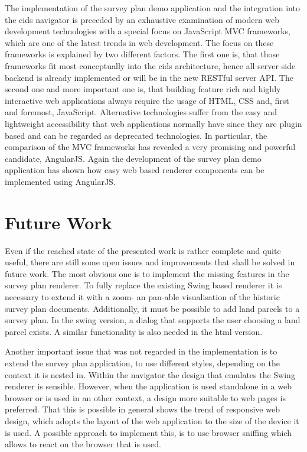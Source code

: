 The implementation of the survey plan demo application and the integration into the cids navigator is preceded by an exhaustive examination of modern web development technologies with a special focus on JavaScript MVC frameworks, which are one of the latest trends in web development. 
The focus on these frameworks is explained by two different factors. 
The first one is, that those frameworks fit most conceptually into the cids architecture, hence all server side backend is already implemented or will be in the new RESTful server API. 
The second one and more important one is, that building feature rich and highly interactive web applications always require the usage of HTML, CSS and, first and foremost, JavaScript. 
Alternative technologies suffer from the easy and lightweight accessibility that web applications normally have since they are plugin based and can be regarded as deprecated technologies. 
In particular, the comparison of the MVC frameworks has revealed a very promising and powerful candidate, AngularJS. 
Again the development of the survey plan demo application has shown how easy web based renderer components can be implemented using AngularJS.  

\newpage

\section{Future Work}

Even if the reached state of the presented work is rather complete and quite useful, there are still some open issues and improvements that shall be solved in future work. 
The most obvious one is to implement the missing features in the survey plan renderer. 
To fully replace the existing Swing based renderer it is necessary to extend it with a zoom- an pan-able visualisation of the historic survey plan documents. 
Additionally, it must be possible to add land parcels to a survey plan. 
In the swing version, a dialog that supports the user choosing a land parcel exists. 
A similar functionality is also needed in the html version.

Another important issue that was not regarded in the implementation is to extend the survey plan application, to use different styles, depending on the context it is nested in.
Within the navigator the design that emulates the Swing renderer is sensible. 
However, when the application is used standalone in a web browser or is used in an other context, a design more suitable to web pages is preferred. 
That this is possible in general shows the trend of responsive web design, which adopts the layout of the web application to the size of the device it is used. 
A possible approach to implement this, is to use browser sniffing which allows to react on the browser that is used.

